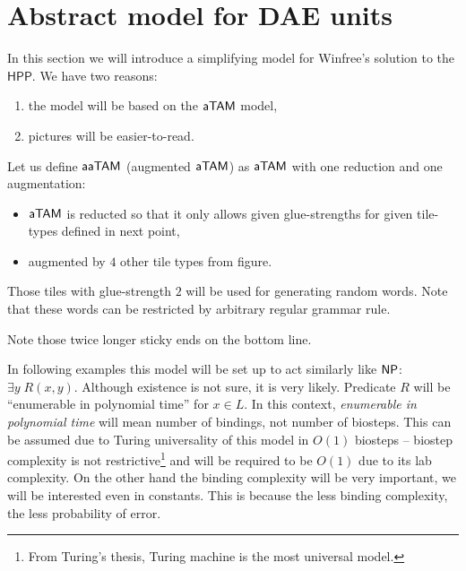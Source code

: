\section{Abstract model for DAE units}

In this section we will introduce a simplifying model for Winfree's solution to the $\mathsf{HPP}$. We have two reasons:
\begin{enumerate}   %
	\item the model will be based on the $\mathsf{aTAM}$ model,
	\item pictures will be easier-to-read.
\end{enumerate}

\begin{defn}   %
	Let us define $\mathsf{aaTAM}$ (augmented $\mathsf{aTAM}$) as $\mathsf{aTAM}$ with one reduction and one augmentation:
	\begin{itemize}
		\item $\mathsf{aTAM}$ is reducted so that it only allows given glue-strengths for given tile-types defined in next point,
		\item augmented by $4$ other tile types from figure. %
	\end{itemize}
\end{defn}

\begin{remark}   %
	Those tiles with glue-strength $2$ will be used for generating random words. Note that these words can be restricted by arbitrary regular grammar rule.
\end{remark}


Note those twice longer sticky ends on the bottom line.

In following examples this model will be set up to act similarly like $\mathsf{NP}$: $\exists y \; R(x,y)$. Although existence is not sure, it is very likely. Predicate $R$ will be ``enumerable in polynomial time'' for $x \in L$. In this context, {\em enumerable in polynomial time} will mean number of bindings, not number of biosteps. This can be assumed due to Turing universality of this model in $O(1)$ biosteps -- biostep complexity is not restrictive\footnote{From Turing's thesis, Turing machine is the most universal model.} and will be required to be $O(1)$ due to its lab complexity. On the other hand the binding complexity will be very important, we will be interested even in constants. This is because the less binding complexity, the less probability of error.

